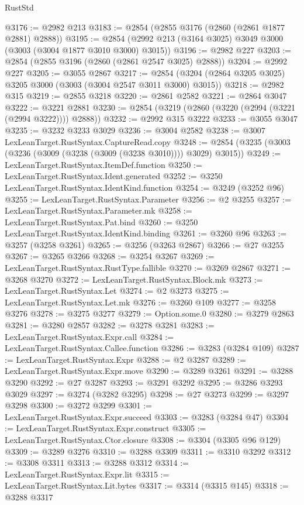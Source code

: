 \begin{lexlean}{RustStd}
\begin{coremodule}
@3176 := @2982 @213
@3183 := @2854 (@2855 @3176 (@2860 (@2861 @1877 @2881) @2888))
@3195 := @2854 (@2992 @213 (@3164 @3025) @3049 @3000 (@3003 (@3004 @1877 @3010 @3000) @3015))
@3196 := @2982 @227
@3203 := @2854 (@2855 @3196 (@2860 (@2861 @2547 @3025) @2888))
@3204 := @2992 @227
@3205 := @3055 @2867
@3217 := @2854 (@3204 (@2864 @3205 @3025) @3205 @3000 (@3003 (@3004 @2547 @3011 @3000) @3015))
@3218 := @2982 @315
@3219 := @2855 @3218
@3220 := @2861 @2582
@3221 := @2864 @3047
@3222 := @3221 @2881
@3230 := @2854 (@3219 (@2860 (@3220 (@2994 (@3221 (@2994 @3222)))) @2888))
@3232 := @2992 @315 @3222
@3233 := @3055 @3047
@3235 := @3232 @3233 @3029
@3236 := @3004 @2582
@3238 := @3007 LexLeanTarget.RustSyntax.CaptureRead.copy
@3248 := @2854 (@3235 (@3003 (@3236 (@3009 (@3238 (@3009 (@3238 @3010)))) @3029) @3015))
@3249 := LexLeanTarget.RustSyntax.ItemDef.function
@3250 := LexLeanTarget.RustSyntax.Ident.generated
@3252 := @3250 LexLeanTarget.RustSyntax.IdentKind.function
@3254 := @3249 (@3252 @96)
@3255 := LexLeanTarget.RustSyntax.Parameter
@3256 := @2 @3255
@3257 := LexLeanTarget.RustSyntax.Parameter.mk
@3258 := LexLeanTarget.RustSyntax.Pat.bind
@3260 := @3250 LexLeanTarget.RustSyntax.IdentKind.binding
@3261 := @3260 @96
@3263 := @3257 (@3258 @3261)
@3265 := @3256 (@3263 @2867)
@3266 := @27 @3255
@3267 := @3265 @3266
@3268 := @3254 @3267
@3269 := LexLeanTarget.RustSyntax.RustType.fallible
@3270 := @3269 @2867
@3271 := @3268 @3270
@3272 := LexLeanTarget.RustSyntax.Block.mk
@3273 := LexLeanTarget.RustSyntax.Let
@3274 := @2 @3273
@3275 := LexLeanTarget.RustSyntax.Let.mk
@3276 := @3260 @109
@3277 := @3258 @3276
@3278 := @3275 @3277
@3279 := Option.some.{0}
@3280 := @3279 @2863
@3281 := @3280 @2857
@3282 := @3278 @3281
@3283 := LexLeanTarget.RustSyntax.Expr.call
@3284 := LexLeanTarget.RustSyntax.Callee.function
@3286 := @3283 (@3284 @109)
@3287 := LexLeanTarget.RustSyntax.Expr
@3288 := @2 @3287
@3289 := LexLeanTarget.RustSyntax.Expr.move
@3290 := @3289 @3261
@3291 := @3288 @3290
@3292 := @27 @3287
@3293 := @3291 @3292
@3295 := @3286 @3293 @3029
@3297 := @3274 (@3282 @3295)
@3298 := @27 @3273
@3299 := @3297 @3298
@3300 := @3272 @3299
@3301 := LexLeanTarget.RustSyntax.Expr.succeed
@3303 := @3283 (@3284 @47)
@3304 := LexLeanTarget.RustSyntax.Expr.construct
@3305 := LexLeanTarget.RustSyntax.Ctor.closure
@3308 := @3304 (@3305 @96 @129)
@3309 := @3289 @3276
@3310 := @3288 @3309
@3311 := @3310 @3292
@3312 := @3308 @3311
@3313 := @3288 @3312
@3314 := LexLeanTarget.RustSyntax.Expr.lit
@3315 := LexLeanTarget.RustSyntax.Lit.bytes
@3317 := @3314 (@3315 @145)
@3318 := @3288 @3317

\end{coremodule}
\end{lexlean}
